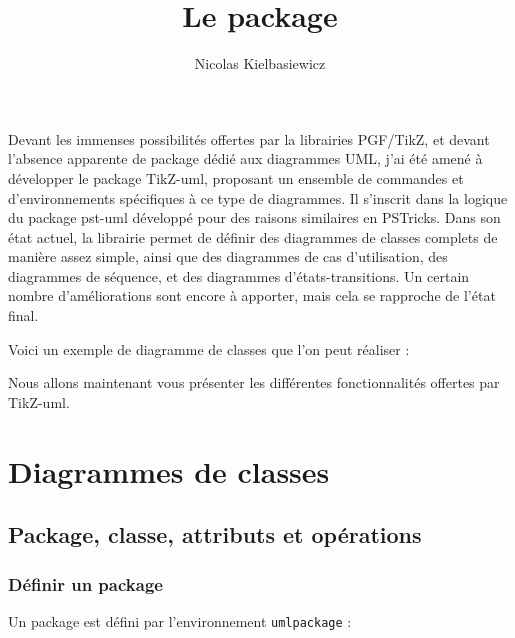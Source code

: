 \documentclass[a4paper,11pt]{report}
\title{Le package \tuml} %
\author{Nicolas {\sc Kielbasiewicz}} %
\newcommand{\inputTikZ}[1]{%
  }%
\newcommand{\inputTikZ}[1]{%
    \texttt{[image: fig/\#1.pdf]}%
  }%
\newcommand{\tuml}{{\sc TikZ-uml}}
\begin{document}
\maketitle

Devant les immenses possibilités offertes par la librairies PGF/TikZ, et devant l'absence apparente de package dédié aux diagrammes UML, j'ai été amené à développer le package \tuml, proposant un ensemble de commandes et d'environnements spécifiques à ce type de diagrammes. Il s'inscrit dans la logique du package pst-uml développé pour des raisons similaires en PSTricks. Dans son état actuel, la librairie permet de définir des diagrammes de classes complets de manière assez simple, ainsi que des diagrammes de cas d'utilisation, des diagrammes de séquence, et des diagrammes d'états-transitions. Un certain nombre d'améliorations sont encore à apporter, mais cela se rapproche de l'état final.

Voici un exemple de diagramme de classes que l'on peut réaliser :

\begin{center}
\inputTikZ{figure1}
\end{center}

Nous allons maintenant vous présenter les différentes fonctionnalités offertes par \tuml.

\tableofcontents

\chapter{Diagrammes de classes}\label{c.class}

\section{Package, classe, attributs et opérations}\label{s.packageclass}

\subsection{Définir un package}\label{ss.package}

Un package est défini par l'environnement {\tt umlpackage} :

\medskip

\begin{minipage}{0.5\textwidth}

\end{minipage}
\begin{minipage}{0.4\textwidth}
\begin{center}
\inputTikZ{figure2}
\end{center}
\end{minipage}
\end{document}
